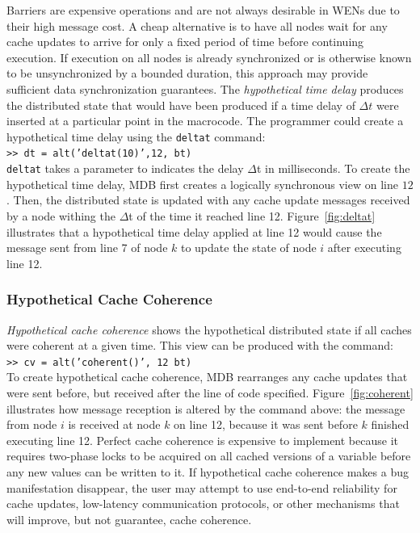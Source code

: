 Barriers are expensive operations and are not always desirable in WENs due to
their high message cost.  A cheap alternative is to have all nodes wait for any
cache updates to arrive for only a fixed period of time before continuing
execution.  If execution on all nodes is already synchronized or is otherwise
known to be unsynchronized by a bounded duration, this approach may provide
sufficient data synchronization guarantees.  The \emph{hypothetical time delay}
produces the distributed state that would have been produced if a time delay of
$\Delta t$ were inserted at a particular point in the macrocode. The programmer
could create a hypothetical time delay using the {\tt deltat} command:\\
{\small\indent\tt >> dt = alt('deltat(10)',12, bt)}\\ {\tt deltat} takes a
parameter to indicates the delay $\Delta$t in milliseconds.  To create the
hypothetical time delay, MDB first creates a logically synchronous view on line
$12$. Then, the distributed state is updated with any cache update messages
received by a node withing the $\Delta$t of the time it reached line 12.
Figure~\ref{fig:deltat} illustrates that a hypothetical time delay applied at
line 12 would cause the message sent from line 7 of node $k$ to update the state
of node $i$ after executing line 12.

\subsubsection{Hypothetical Cache Coherence} \label{coherent}

\emph{ Hypothetical cache coherence} shows the hypothetical distributed state if all
caches were coherent at a given time. This view can be produced with the
command:\\ { {\small\indent\tt >> cv = alt('coherent()', 12
    bt)}}\\ To create hypothetical cache coherence, MDB rearranges any cache updates
that were sent before, but received after the line of code
specified. Figure~\ref{fig:coherent} illustrates how message reception is
altered by the command above: the message from node $i$ is received at node $k$
on line 12, because it was sent before $k$ finished executing line 12.  Perfect
cache coherence is expensive to implement because it requires two-phase locks to
be acquired on all cached versions of a variable before any new values can be
written to it.  If hypothetical cache coherence makes a bug manifestation disappear,
the user may attempt to use end-to-end reliability for cache updates,
low-latency communication protocols, or other mechanisms that will improve, but
not guarantee, cache coherence.

